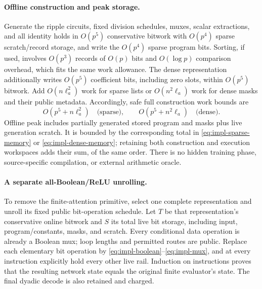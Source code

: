 \paragraph{Offline construction and peak storage.}
Generate the ripple circuits, fixed division schedules, muxes, scalar
extractions, and all identity holds in $O(p^5)$ conservative bitwork with
$O(p^4)$ sparse scratch/record storage, and write the $O(p^4)$ sparse
program bits. Sorting, if used, involves $O(p^3)$ records of $O(p)$ bits
and $O(\log p)$ comparison overhead, which fits the same work allowance.
The dense representation additionally writes $O(p^5)$ coefficient bits,
including zero slots, within $O(p^5)$ bitwork. Add
$O(n\ell_a^2)$ work for sparse lists or $O(n^2\ell_a)$ work for dense
masks and their public metadata. Accordingly, safe full construction
work bounds are
\begin{equation}\label{eq:impl-offline-work}
 O(p^5+n\ell_a^2)\quad\text{(sparse)},\qquad
 O(p^5+n^2\ell_a)\quad\text{(dense)}.
\end{equation}
Offline peak includes partially generated stored program and masks plus
live generation scratch. It is bounded by the corresponding total in
\eqref{eq:impl-sparse-memory} or \eqref{eq:impl-dense-memory}; retaining
both construction and execution workspaces adds their sum, of the same
order. There is no hidden training phase, source-specific compilation,
or external arithmetic oracle.

\paragraph{A separate all-Boolean/ReLU unrolling.}
To remove the finite-attention primitive, select one complete
representation and unroll its fixed public bit-operation schedule. Let
$T$ be that representation's conservative online bitwork and $S$ its total
live bit storage, including input, program/constants, masks, and scratch.
Every conditional data operation is already a Boolean mux; loop lengths
and permitted routes are public. Replace each elementary bit operation by
\eqref{eq:impl-boolean}--\eqref{eq:impl-mux}, and at every instruction
explicitly hold every other live rail. Induction on instructions proves
that the resulting network state equals the original finite evaluator's
state. The final dyadic decode is also retained and charged.

